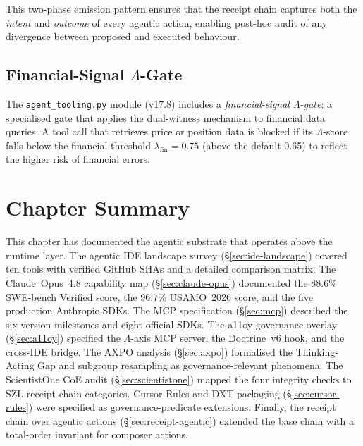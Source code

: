 This two-phase emission pattern ensures that the receipt chain captures
both the \emph{intent} and \emph{outcome} of every agentic action,
enabling post-hoc audit of any divergence between proposed and executed
behaviour.

\subsection{Financial-Signal \(\Lambda\)-Gate}
\label{ssec:financial-gate}

The \texttt{agent\_tooling.py} module (v17.8) includes a
\emph{financial-signal \(\Lambda\)-gate}: a specialised gate that applies
the dual-witness mechanism to financial data queries.  A tool call that
retrieves price or position data is blocked if its \(\Lambda\)-score falls
below the financial threshold \(\lambda_{\mathrm{fin}} = 0.75\)
(above the default 0.65) to reflect the higher risk of financial errors.

\section{Chapter Summary}
\label{sec:agentic-summary}

This chapter has documented the agentic substrate that operates above the
runtime layer.  The agentic IDE landscape survey (\S\ref{sec:ide-landscape})
covered ten tools with verified GitHub SHAs and a detailed comparison matrix.
The Claude~Opus~4.8 capability map (\S\ref{sec:claude-opus}) documented the
88.6\% SWE-bench Verified score, the 96.7\% USAMO~2026 score, and the five
production Anthropic SDKs.  The MCP specification (\S\ref{sec:mcp}) described
the six version milestones and eight official SDKs.  The a11oy governance
overlay (\S\ref{sec:a11oy}) specified the \(\Lambda\)-axis MCP server, the
Doctrine~v6 hook, and the cross-IDE bridge.  The AXPO analysis
(\S\ref{sec:axpo}) formalised the Thinking-Acting Gap and subgroup resampling
as governance-relevant phenomena.  The ScientistOne CoE audit
(\S\ref{sec:scientistone}) mapped the four integrity checks to SZL receipt-chain
categories.  Cursor Rules and DXT packaging (\S\ref{sec:cursor-rules}) were
specified as governance-predicate extensions.  Finally, the receipt chain over
agentic actions (\S\ref{sec:receipt-agentic}) extended the base chain with
a total-order invariant for composer actions.

